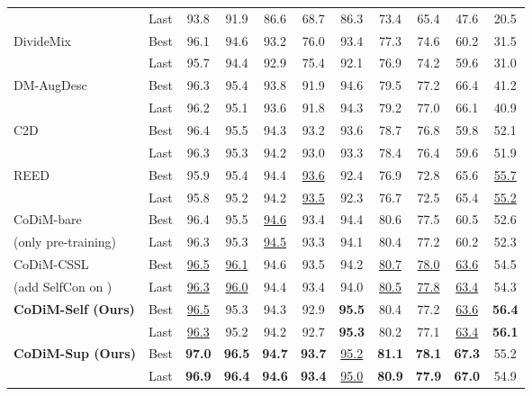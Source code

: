 \documentclass[letterpaper]{article} \usepackage{aaai22}  \usepackage{times}  \usepackage{helvet}  \usepackage{courier}  \usepackage[hyphens]{url}  \usepackage{graphicx} \usepackage{subfigure}
\begin{document}
\begin{table*}[h]
\begin{center}
\begin{tabular}{lcccccccccc}
 & Last & 93.8 & 91.9 & 86.6 & 68.7 & 86.3 & 73.4 & 65.4 & 47.6 & 20.5 \\
\multirow{2}{*}{DivideMix \cite{li2020dividemix}} & Best & 96.1 & 94.6 & 93.2 & 76.0 & 93.4 & 77.3 & 74.6 & 60.2 & 31.5 \\
 & Last & 95.7 & 94.4 & 92.9 & 75.4 & 92.1 & 76.9 & 74.2 & 59.6 & 31.0 \\
\multirow{2}{*}{DM-AugDesc \cite{nishi2021augmentation}} & Best & 96.3 & 95.4 & 93.8 & 91.9 & 94.6 & 79.5 & 77.2 & 66.4 & 41.2 \\
 & Last & 96.2 & 95.1 & 93.6 & 91.8 & 94.3 & 79.2 & 77.0 & 66.1 & 40.9 \\
\multirow{2}{*}{C2D\cite{zheltonozhskii2021contrast} } & Best & 96.4 & 95.5 & 94.3 & 93.2 & 93.6 & 78.7 & 76.8 & 59.8 & 52.1 \\
 & Last & 96.3 & 95.3 & 94.2 & 93.0 & 93.3 & 78.4 & 76.4 & 59.6 & 51.9 \\
\multirow{2}{*}{REED \cite{zhang2020decoupling}} & Best & 95.9 & 95.4 & 94.4 & \underline{93.6} & 92.4 & 76.9 & 72.8 & 65.6 & \underline{55.7} \\
 & Last & 95.8 & 95.2 & 94.2 & \underline{93.5} & 92.3 & 76.7 & 72.5 & 65.4 &  \underline{55.2} \\
\hline
\hline
CoDiM-bare & Best & 96.4 & 95.5 & \underline{94.6} & 93.4 & 94.4 & 80.6 & 77.5 & 60.5 & 52.6 \\
(only pre-training) & Last & 96.3 & 95.3 & \underline{94.5} & 93.3 & 94.1 & 80.4 & 77.2 & 60.2 & 52.3 \\
\hline
CoDiM-CSSL & Best & \underline{96.5} & \underline{96.1} & 94.6 & 93.5 & 94.2 & \underline{80.7} & \underline{78.0} & \underline{63.6} & 54.5 \\
(add SelfCon on )& Last & \underline{96.3} & \underline{96.0} & 94.4 & 93.4 & 94.0 & \underline{80.5} & \underline{77.8} & \underline{63.4} & 54.3 \\
\hline
\multirow{2}{*}{\textbf{CoDiM-Self (Ours)}} & Best & \underline{96.5} & 95.3 & 94.3 & 92.9 & \textbf{95.5} & 80.4 & 77.2 & \underline{63.6} & \textbf{56.4} \\
& Last & \underline{96.3} & 95.2 & 94.2 & 92.7 & \textbf{95.3} & 80.2 & 77.1 & \underline{63.4} & \textbf{56.1} \\
\hline
\multirow{2}{*}{\textbf{CoDiM-Sup (Ours)}} & Best & \textbf{97.0} & \textbf{96.5} & \textbf{94.7} & \textbf{93.7} & \underline{95.2} & \textbf{81.1} & \textbf{78.1} & \textbf{67.3} & 55.2 \\
 & Last & \textbf{96.9} & \textbf{96.4} & \textbf{94.6} & \textbf{93.4} & \underline{95.0} & \textbf{80.9} & \textbf{77.9} & \textbf{67.0} & 54.9 \\

\end{tabular}
\end{center}
\end{table*}
\end{document}
